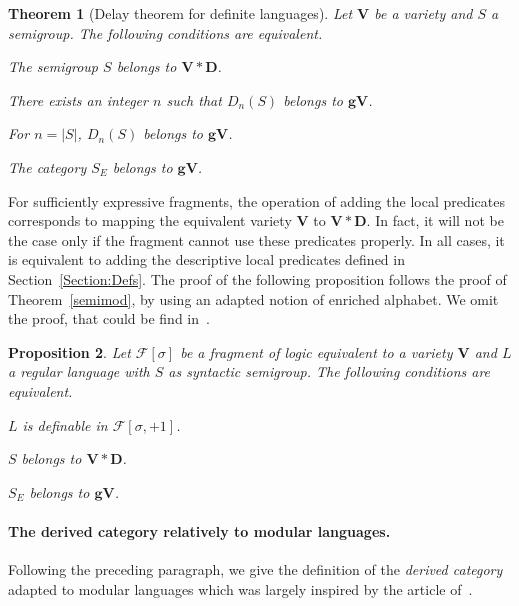 \documentclass[submission,hidelink]{dmtcs-episciences}
\newtheorem{theorem}{Theorem}
\newtheorem{proposition}[theorem]{Proposition}
\newcommand{\D}{\mathbf{D}}
\newcommand{\V}{\mathbf{V}}
\newcommand{\gV}{\mathbf{gV}}
\newcommand{\cF}{\mathcal{F}}
\newenvironment{conditions}
{\begin{list}{\rm (\theenumi)}{\noindent \usecounter{enumi}\setlength{\topsep}{2pt}\setlength{\partopsep}{0pt}\setlength{\itemsep}{2pt}\setlength{\parsep}{0pt}\setlength{\leftmargin}{2.5em}\setlength{\labelwidth}{1.5em}\setlength{\labelsep}{0.5em}\setlength{\listparindent}{0pt}\setlength{\itemindent}{0pt}}}{\end{list}}
\begin{document}
		\begin{theorem}[Delay theorem for definite languages]\label{thm:delaydefinite}
			Let $\V$ be a variety and $S$ a semigroup. The following conditions are equivalent.
			\begin{conditions}
				\item The semigroup $S$ belongs to $\V*\D$.
				\item There exists an integer $n$ such that $D_n(S)$ belongs to $\gV$.
				\item For $n=|S|$, $D_n(S)$ belongs to $\gV$.
				\item The category $S_E$ belongs to $\gV$.
			\end{conditions}
		\end{theorem}
		For sufficiently expressive fragments, the operation of adding the local predicates corresponds to mapping the equivalent variety $\V$ to $\V*\D$.
		In fact, it will not be the case only if the fragment cannot use these predicates properly.
		In all cases, it is equivalent to adding the descriptive local predicates defined in Section~\ref{Section:Defs}.
The proof of the following proposition follows the proof of Theorem~\ref{semimod}, by using an adapted
		notion of enriched alphabet. We omit the proof, that could be find in~\cite{PapermanPhd}.
	\begin{proposition}\label{Prop:localpredfragment}
			Let $\cF[\sigma]$ be a
			fragment of logic equivalent to a variety $\V$ and
			$L$ a regular language with $S$ as syntactic semigroup.
			The following conditions are equivalent.
			\begin{conditions}
\item {$L$ is definable in $\cF[\sigma,+1]$.}
				\item $S$ belongs to $\V*\D$.
				\item $S_E$ belongs to $\gV$.
			\end{conditions}
		\end{proposition}
	\paragraph{The derived category relatively to modular languages.}
		Following the preceding paragraph, we give the definition of the \emph{derived category} adapted to
		modular languages which was largely inspired by the article of~\cite{CPS06b}.
\end{document}
